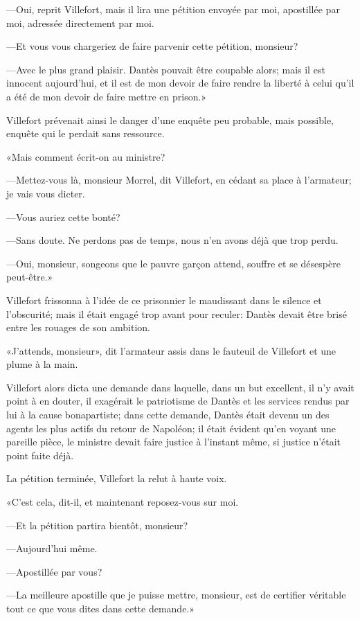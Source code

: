 —Oui, reprit Villefort, mais il lira une pétition envoyée par moi, apostillée par moi, adressée directement par moi.

—Et vous vous chargeriez de faire parvenir cette pétition, monsieur?

—Avec le plus grand plaisir. Dantès pouvait être coupable alors; mais il est innocent aujourd'hui, et il est de mon devoir de faire rendre la liberté à celui qu'il a été de mon devoir de faire mettre en prison.»

Villefort prévenait ainsi le danger d'une enquête peu probable, mais possible, enquête qui le perdait sans ressource.

«Mais comment écrit-on au ministre?

—Mettez-vous là, monsieur Morrel, dit Villefort, en cédant sa place à l'armateur; je vais vous dicter.

—Vous auriez cette bonté?

—Sans doute. Ne perdons pas de temps, nous n'en avons déjà que trop perdu.

—Oui, monsieur, songeons que le pauvre garçon attend, souffre et se désespère peut-être.»

Villefort frissonna à l'idée de ce prisonnier le maudissant dans le silence et l'obscurité; mais il était engagé trop avant pour reculer: Dantès devait être brisé entre les rouages de son ambition.

«J'attends, monsieur», dit l'armateur assis dans le fauteuil de Villefort et une plume à la main.

Villefort alors dicta une demande dans laquelle, dans un but excellent, il n'y avait point à en douter, il exagérait le patriotisme de Dantès et les services rendus par lui à la cause bonapartiste; dans cette demande, Dantès était devenu un des agents les plus actifs du retour de Napoléon; il était évident qu'en voyant une pareille pièce, le ministre devait faire justice à l'instant même, si justice n'était point faite déjà.

La pétition terminée, Villefort la relut à haute voix.

«C'est cela, dit-il, et maintenant reposez-vous sur moi.

—Et la pétition partira bientôt, monsieur?

—Aujourd'hui même.

—Apostillée par vous?

—La meilleure apostille que je puisse mettre, monsieur, est de certifier véritable tout ce que vous dites dans cette demande.»

